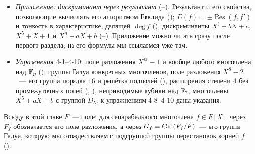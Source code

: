 \begin{itemize}[leftmargin=*]
(, ).
\item \emph{Приложение: дискриминант через результант} (--). Результант и его свойства, позволяющие
вычислять его алгоритмом Евклида (); $D(f)=\pm\operatorname{Res}(f,f')$ и тонкость в характеристике, делящей
$\deg f$ (); дискриминанты $X^3+bX+c$, $X^5+X+1$ и $X^n+aX+b$ (--). Приложение можно читать
сразу после первого раздела; на его формулы мы ссылаемся уже там.
\item \emph{Упражнения} 4-1--4-10: поле разложения $X^m-1$ и вообще любого многочлена над $\mathbb F_p$ (), группы Галуа
конкретных многочленов, поле разложения $X^8-2$~--- его группа порядка $16$ и решётка подполей (), расширения
степени $4$ без промежуточных полей (, ), неприводимые кубики над $\mathbb F_7$, многочлены $X^5+aX+b$ с
группой $D_5$; к упражнениям 4-8--4-10 даны указания.
\end{itemize}

Всюду в этой главе $F$~--- поле; для сепарабельного многочлена $f\in F[X]$ через $F_f$ обозначается его поле разложения,
а через $G_f=\operatorname{Gal}(F_f/F)$~--- его группа Галуа, которую мы отождествляем с подгруппой группы перестановок корней $f$
().
